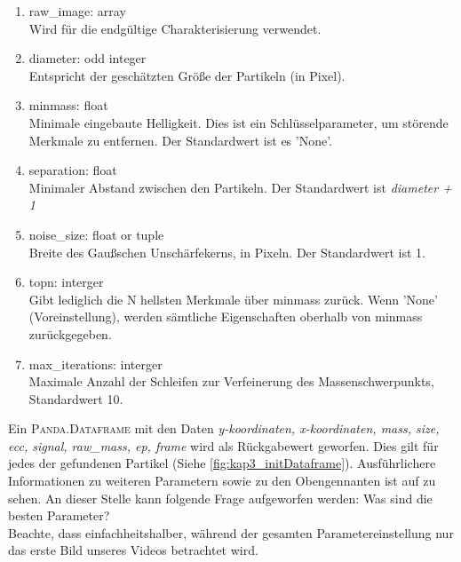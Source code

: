 		\begin{enumerate}
    			\item raw\_image: array \\
    			Wird für die endgültige Charakterisierung verwendet.
    			\item diameter: odd integer \\
    			Entspricht der geschätzten Größe der Partikeln (in Pixel).
    			\item minmass: float \\
    			Minimale eingebaute Helligkeit. Dies ist ein Schlüsselparameter, um störende 				Merkmale zu entfernen. Der Standardwert ist es 'None'.
    			\item separation: float\\
    			Minimaler Abstand zwischen den Partikeln. Der Standardwert ist \textit{diameter + 1}   			
    			\item noise\_size: float or tuple\\
    			Breite des Gaußschen Unschärfekerns, in Pixeln. Der Standardwert ist 1.
    			\item topn: interger\\
    			Gibt lediglich die N hellsten Merkmale über minmass zurück. Wenn 							'None' (Voreinstellung), werden sämtliche Eigenschaften oberhalb von minmass 				zurückgegeben.
    			\item max\_iterations: interger\\
    			Maximale Anzahl der Schleifen zur Verfeinerung des Massenschwerpunkts, 					Standardwert 10.
    			
		\end{enumerate}
		
Ein \textsc{Panda.Dataframe} mit den Daten \textit{y-koordinaten, x-koordinaten, mass, size, ecc, signal, raw\_mass, ep, frame} wird als Rückgabewert geworfen. Dies gilt für jedes der gefundenen Partikel (Siehe \ref{fig:kap3_initDataframe}).
Ausführlichere Informationen zu  weiteren Parametern sowie zu den Obengennanten ist auf \cite{Tp} zu sehen.%
An dieser Stelle kann folgende Frage aufgeworfen werden: Was sind die besten Parameter? \\
Beachte, dass einfachheitshalber, während der gesamten Parametereinstellung nur das erste Bild unseres Videos betrachtet wird.

